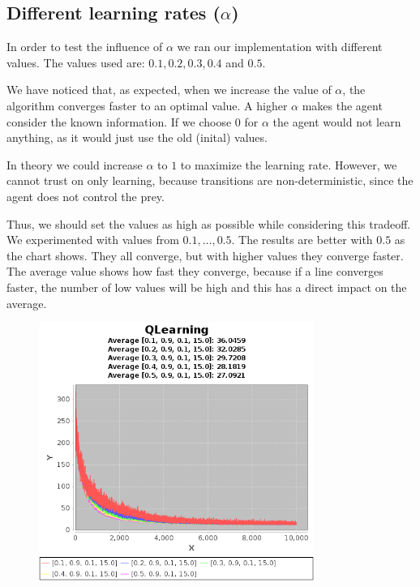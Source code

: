 \documentclass{article}
\begin{document}
\subsection{Different learning rates ($\alpha$)}
In order to test the influence of $\alpha$ we ran our implementation with
different values. The values used are:
$0.1 , 0.2, 0.3, 0.4$ and $0.5$. 

We have noticed that, as expected, when we increase the value of $\alpha$, the 
algorithm converges faster to an optimal value. A higher $\alpha$  makes the agent
consider the known information. If we choose $0$ for $\alpha$ the agent
would not learn anything, as it would just use the old (inital) values.

In theory we could increase $\alpha$ to $1$ to maximize the learning rate. However, we cannot trust on only learning, because transitions are non-deterministic, since the agent does not control the prey.

Thus, we should set the values as high as possible while considering this tradeoff.
We experimented with values from $0.1, \ldots , 0.5$. The results are
better with $0.5$ as the chart shows. They all converge, but with higher values
they converge faster. The average value shows how fast they converge, because if
a line converges faster, the number of low values will be high and this has a
direct impact on the average.

\begin{figure}[h]
\centering
\includegraphics[width=0.8\textwidth]{res/alpha_01_to_05_gama_09_epsilon_01_IV_15.png}
\end{figure}
\end{document}
